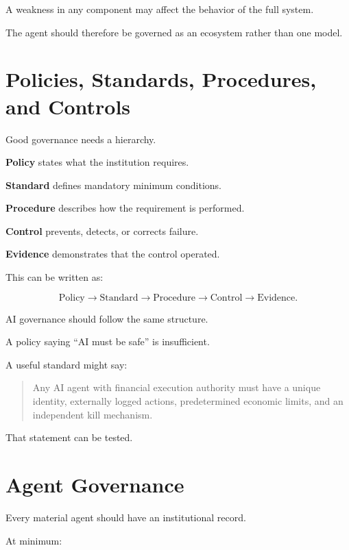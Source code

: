 A weakness in any component may affect the behavior of the full system.

The agent should therefore be governed as an ecosystem rather than one model.

\section{Policies, Standards, Procedures, and Controls}

Good governance needs a hierarchy.

\textbf{Policy} states what the institution requires.

\textbf{Standard} defines mandatory minimum conditions.

\textbf{Procedure} describes how the requirement is performed.

\textbf{Control} prevents, detects, or corrects failure.

\textbf{Evidence} demonstrates that the control operated.

This can be written as:

\begin{equation}
\text{Policy}
\rightarrow
\text{Standard}
\rightarrow
\text{Procedure}
\rightarrow
\text{Control}
\rightarrow
\text{Evidence}.
\end{equation}

AI governance should follow the same structure.

A policy saying ``AI must be safe'' is insufficient.

A useful standard might say:

\begin{quote}
Any AI agent with financial execution authority must have a unique identity, externally logged actions, predetermined economic limits, and an independent kill mechanism.
\end{quote}

That statement can be tested.

\section{Agent Governance}

Every material agent should have an institutional record.

At minimum:

